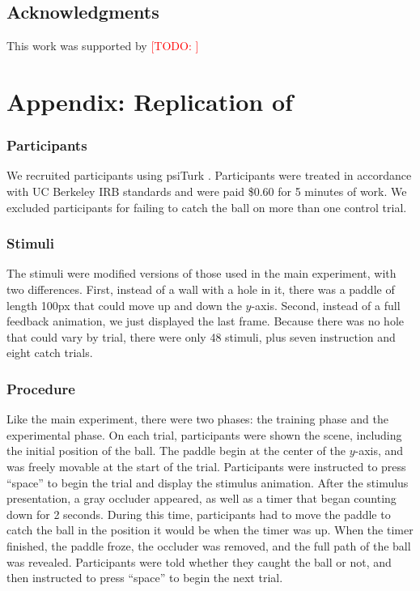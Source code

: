 \documentclass[10pt,letterpaper]{article}
\newcommand{\TODO}[1]{\textcolor{red}{[TODO: #1]}}
\begin{document}
\subsection{Acknowledgments}

This work was supported by \TODO{}

\section{Appendix: Replication of }

\subsubsection{Participants}

We recruited \PaddleNumComplete{} participants using psiTurk \cite{McDonnell12}.
Participants were treated in accordance with UC Berkeley IRB standards and were paid \$0.60 for 5 minutes of work.
We excluded \PaddleNumFailed{} participants for failing to catch the ball on more than one control trial.

\subsubsection{Stimuli}

The stimuli were modified versions of those used in the main experiment, with two differences.
First, instead of a wall with a hole in it, there was a paddle of length 100px that could move up and down the $y$-axis.
Second, instead of a full feedback animation, we just displayed the last frame.
Because there was no hole that could vary by trial, there were only 48 stimuli, plus seven instruction and eight catch trials.

\subsubsection{Procedure}

Like the main experiment, there were two phases: the training phase and the experimental phase.
On each trial, participants were shown the scene, including the initial position of the ball.
The paddle begin at the center of the $y$-axis, and was freely movable at the start of the trial.
Participants were instructed to press ``space'' to begin the trial and display the stimulus animation.
After the stimulus presentation, a gray occluder appeared, as well as a timer that began counting down for 2 seconds.
During this time, participants had to move the paddle to catch the ball in the position it would be when the timer was up.
When the timer finished, the paddle froze, the occluder was removed, and the full path of the ball was revealed.
Participants were told whether they caught the ball or not, and then instructed to press ``space'' to begin the next trial.
\end{document}
